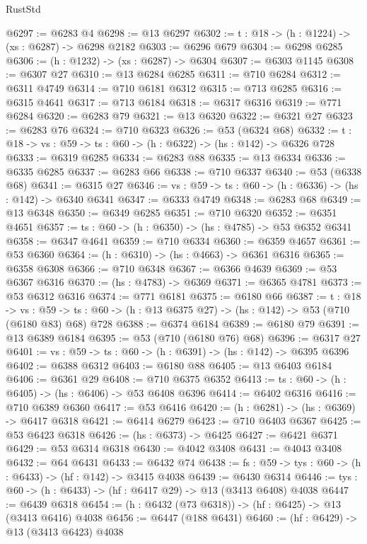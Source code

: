 \begin{lexlean}{RustStd}
\begin{coremodule}
@6297 := @6283 @4
@6298 := @13 @6297
@6302 := {t : @18} -> (h : @1224) -> (xs : @6287) -> @6298 @2182
@6303 := @6296 @679
@6304 := @6298 @6285
@6306 := (h : @1232) -> (xs : @6287) -> @6304
@6307 := @6303 @1145
@6308 := @6307 @27
@6310 := @13 @6284 @6285
@6311 := @710 @6284
@6312 := @6311 @4749
@6314 := @710 @6181 @6312
@6315 := @713 @6285
@6316 := @6315 @4641
@6317 := @713 @6184
@6318 := @6317 @6316
@6319 := @771 @6284
@6320 := @6283 @79
@6321 := @13 @6320
@6322 := @6321 @27
@6323 := @6283 @76
@6324 := @710 @6323
@6326 := @53 (@6324 @68)
@6332 := {t : @18} -> {vs : @59} -> {ts : @60} -> (h : @6322) -> (hs : @142) -> @6326 @728
@6333 := @6319 @6285
@6334 := @6283 @88
@6335 := @13 @6334
@6336 := @6335 @6285
@6337 := @6283 @66
@6338 := @710 @6337
@6340 := @53 (@6338 @68)
@6341 := @6315 @27
@6346 := {vs : @59} -> {ts : @60} -> (h : @6336) -> (hs : @142) -> @6340 @6341
@6347 := @6333 @4749
@6348 := @6283 @68
@6349 := @13 @6348
@6350 := @6349 @6285
@6351 := @710 @6320
@6352 := @6351 @4651
@6357 := {ts : @60} -> (h : @6350) -> (hs : @4785) -> @53 @6352 @6341
@6358 := @6347 @4641
@6359 := @710 @6334
@6360 := @6359 @4657
@6361 := @53 @6360
@6364 := (h : @6310) -> (hs : @4663) -> @6361 @6316
@6365 := @6358 @6308
@6366 := @710 @6348
@6367 := @6366 @4639
@6369 := @53 @6367 @6316
@6370 := (hs : @4783) -> @6369
@6371 := @6365 @4781
@6373 := @53 @6312 @6316
@6374 := @771 @6181
@6375 := @6180 @66
@6387 := {t : @18} ->
  {vs : @59} -> {ts : @60} -> (h : @13 @6375 @27) -> (hs : @142) -> @53 (@710 (@6180 @83) @68) @728
@6388 := @6374 @6184
@6389 := @6180 @79
@6391 := @13 @6389 @6184
@6395 := @53 (@710 (@6180 @76) @68)
@6396 := @6317 @27
@6401 := {vs : @59} -> {ts : @60} -> (h : @6391) -> (hs : @142) -> @6395 @6396
@6402 := @6388 @6312
@6403 := @6180 @88
@6405 := @13 @6403 @6184
@6406 := @6361 @29
@6408 := @710 @6375 @6352
@6413 := {ts : @60} -> (h : @6405) -> (hs : @6406) -> @53 @6408 @6396
@6414 := @6402 @6316
@6416 := @710 @6389 @6360
@6417 := @53 @6416
@6420 := (h : @6281) -> (hs : @6369) -> @6417 @6318
@6421 := @6414 @6279
@6423 := @710 @6403 @6367
@6425 := @53 @6423 @6318
@6426 := (hs : @6373) -> @6425
@6427 := @6421 @6371
@6429 := @53 @6314 @6318
@6430 := @4042 @3408
@6431 := @4043 @3408
@6432 := @64 @6431
@6433 := @6432 @74
@6438 := {fs : @59} -> {tys : @60} -> (h : @6433) -> (hf : @142) -> @3415 @4038
@6439 := @6430 @6314
@6446 := {tys : @60} -> (h : @6433) -> (hf : @6417 @29) -> @13 (@3413 @6408) @4038
@6447 := @6439 @6318
@6454 := (h : @6432 (@73 @6318)) -> (hf : @6425) -> @13 (@3413 @6416) @4038
@6456 := @6447 (@188 @6431)
@6460 := (hf : @6429) -> @13 (@3413 @6423) @4038

\end{coremodule}
\end{lexlean}
